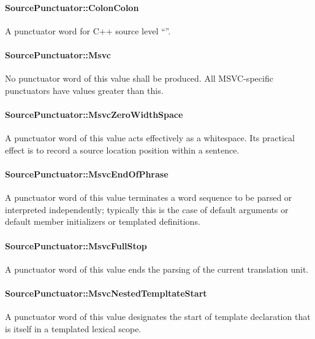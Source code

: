 \paragraph{SourcePunctuator::ColonColon}
\label{sec:ifc:SourcePunctuator:ColonColon}

A punctuator word for C++ source level ``\code{::}''.

\paragraph{SourcePunctuator::Msvc}
\label{sec:ifc:SourcePunctuator:Msvc}

No punctuator word of this value shall be produced.  All MSVC-specific punctuators
have values greater than this.

\paragraph{SourcePunctuator::MsvcZeroWidthSpace}
\label{sec:ifc:SourcePunctuator:MsvcZeroWidthSpace}

A punctuator word of this value acts effectively as a whitespace.  Its practical effect
is to record a source location position within a sentence.

\paragraph{SourcePunctuator::MsvcEndOfPhrase}
\label{sec:ifc:SourcePunctuator:MsvcEndOfPhrase}

A punctuator word of this value terminates a word sequence to be parsed or interpreted
independently; typically this is the case of default arguments or default member
initializers or templated definitions.

\paragraph{SourcePunctuator::MsvcFullStop}
\label{sec:ifc:SourcePunctuator:MsvcFullStop}

A punctuator word of this value ends the parsing of the current translation unit.

\paragraph{SourcePunctuator::MsvcNestedTempltateStart}
\label{sec:ifc:SourcePunctuator:MsvcNestedTemplateStart}

A punctuator word of this value designates the start of template declaration
that is itself in a templated lexical scope.

